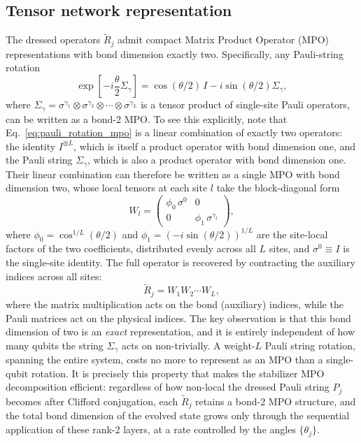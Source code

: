 \documentclass[pra,aps,twocolumn,longbibliography,preprintnumbers,superscriptaddress,nofootnotebib,10pt]{revtex4-2}
\newcommand{\numqubits}{L}  %
\newcommand{\qubitidx}{l}   %
\begin{document}
\subsection{Tensor network representation}
\label{sec:hsmpo_tn}
The dressed operators $\tilde{R}_j$ admit compact Matrix Product Operator 
(MPO) representations with bond dimension exactly two. Specifically, any 
Pauli-string rotation
\begin{equation}
\exp\left[-i\frac{\theta}{2} \Sigma_\gamma\right] 
  = \cos(\theta/2)\, I - i \sin(\theta/2) \Sigma_\gamma,
\label{eq:pauli_rotation_mpo}
\end{equation}
where $\Sigma_\gamma = \sigma^{\gamma_1} \otimes \sigma^{\gamma_2} \otimes 
\cdots \otimes \sigma^{\gamma_\numqubits}$ is a tensor product of single-site Pauli 
operators, can be written as a bond-2 MPO. To see this explicitly, note that 
Eq.~\eqref{eq:pauli_rotation_mpo} is a linear combination of exactly two 
operators: the identity $I^{\otimes \numqubits}$, which is itself a product operator 
with bond dimension one, and the Pauli string $\Sigma_\gamma$, which is also 
a product operator with bond dimension one. Their linear combination can 
therefore be written as a single MPO with bond dimension two, whose local 
tensors at each site $\qubitidx$ take the block-diagonal form
\begin{equation}
W_\qubitidx = \begin{pmatrix} \phi_0 \, \sigma^0 & 0 \\ 0 & \phi_1 \, \sigma^{\gamma_\qubitidx} \end{pmatrix},
\label{eq:mpo_local_tensor}
\end{equation}
where $\phi_0 = \cos^{1/\numqubits}(\theta/2)$ and $\phi_1 = (-i\sin(\theta/2))^{1/\numqubits}$ 
are the site-local factors of the two coefficients, distributed evenly across 
all $\numqubits$ sites, and $\sigma^0 \equiv I$ is the single-site identity. The full 
operator is recovered by contracting the auxiliary indices across all sites:
\begin{equation}
\tilde{R}_j = W_1 W_2 \cdots W_\numqubits,
\end{equation}
where the matrix multiplication acts on the bond (auxiliary) indices, while 
the Pauli matrices act on the physical indices. The key observation is that 
this bond dimension of two is an \textit{exact} representation, and it is 
entirely independent of how many qubits the string $\Sigma_\gamma$ acts on 
non-trivially. A weight-$\numqubits$ Pauli string rotation, spanning the entire 
system, costs no more to represent as an MPO than a single-qubit rotation. 
It is precisely this property that makes the stabilizer MPO decomposition 
efficient: regardless of how non-local the dressed Pauli string $P_j$ becomes 
after Clifford conjugation, each $\tilde{R}_j$ retains a bond-2 MPO structure, 
and the total bond dimension of the evolved state grows only through the 
sequential application of these rank-2 layers, at a rate controlled 
by the angles $\{\theta_j\}$.
\end{document}
